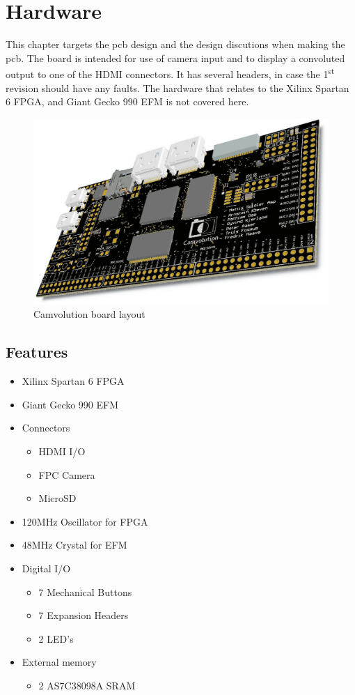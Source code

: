 \section{Hardware}
This chapter targets the pcb design and the design discutions when making the pcb. The board is intended for use of camera input and to display a convoluted output to one of the HDMI connectors. It has several headers, in case the 1\textsuperscript{st} revision should have any faults. The hardware that relates to the Xilinx Spartan 6 FPGA, and Giant Gecko 990 EFM is not covered here.

\begin{figure}
    \includegraphics[width=\linewidth]{img/OverviewCamvolutionKit}
    \caption{Camvolution board layout}
\end{figure}

\subsection{Features}
\begin{itemize}
    \item Xilinx Spartan 6 FPGA
    \item Giant Gecko 990 EFM
    \item Connectors
        \begin{itemize}
            \item HDMI I/O
            \item FPC Camera
            \item MicroSD
        \end{itemize}
    \item 120MHz Oscillator for FPGA
    \item 48MHz Crystal for EFM
    \item Digital I/O
        \begin{itemize}
            \item 7 Mechanical Buttons
            \item 7 Expansion Headers
            \item 2 LED's
        \end{itemize}
    \item External memory
        \begin{itemize}
            \item 2 AS7C38098A SRAM
        \end{itemize}

\end{itemize}



